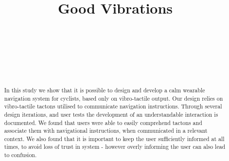 \documentclass{sigchi}
\def\plaintitle{Good Vibrations}
\begin{document}
\title{\plaintitle}

\author{%
  \\
  \\
  \\
  \\
  \\
}

\maketitle

\begin{abstract}
In this study we show that it is possible to design and develop a calm wearable navigation system for cyclists, based only on vibro-tactile output. Our design relies on vibro-tactile tactons utilised to communicate navigation instructions. Through several design iterations, and user tests the development of an understandable interaction is documented. We found that users were able to easily comprehend tactons and associate them with navigational instructions, when communicated in a relevant context. We also found that it is important to keep the user sufficiently informed at all times, to avoid loss of trust in system - however overly informing the user can also lead to confusion.
\end{abstract}
\end{document}
